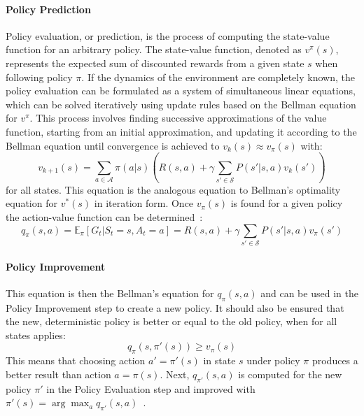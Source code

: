 \documentclass[../xlapes02]{subfiles}
\begin{document}
    \paragraph{Policy Prediction}\label{par:policy-prediction}
    Policy evaluation, or prediction, is the process of computing the state-value function for an arbitrary policy. The state-value function, denoted as $v^\pi(s)$, represents the expected sum of discounted rewards from a given state $s$ when following policy $\pi$. If the dynamics of the environment are completely known, the policy evaluation can be formulated as a system of simultaneous linear equations, which can be solved iteratively using update rules based on the Bellman equation for $v^\pi$. This process involves finding successive approximations of the value function, starting from an initial approximation, and updating it according to the Bellman equation until convergence is achieved to $v_k(s) \approx v_{\pi}(s)$ with:
    \[
        v_{k+1}(s) = \sum_{a \in \mathcal{A}} \pi(a|s) \left( R(s, a) + \gamma \sum_{s' \in \mathcal{S}} P(s'|s, a) v_k(s') \right)
    \]
    for all states. This equation is the analogous equation to Bellman's optimality equation for $v^*(s)$ in iteration form. Once $v_{\pi}(s)$ is found for a given policy the action-value function can be determined~\cite{sutton2018reinforcement, FITMT25127}:
    \[
        q_{\pi}(s,a) = \mathbb{E}_{\pi}[G_t|S_t = s, A_t = a] = R(s,a) + \gamma \sum_{s' \in \mathcal{S}} P(s'|s,a) v_{\pi}(s')
    \]

    \paragraph{Policy Improvement}\label{par:policy-improvement}
    This equation is then the Bellman's equation for $q_{\pi}(s,a)$ and can be used in the Policy Improvement step to create a new policy. It should also be ensured that the new, deterministic policy is better or equal to the old policy, when for all states applies:
    \[
        q_{\pi}(s, \pi'(s)) \geq v_{\pi}(s)
    \]
    This means that choosing action $a' = \pi'(s)$ in state $s$ under policy $\pi$ produces a better result than action $a = \pi(s)$. Next, $q_{\pi'}(s, a)$ is computed for the new policy $\pi'$ in the Policy Evaluation step and improved with $\pi'(s) = \arg\max_a q_{\pi'}(s, a)$~\cite{sutton2018reinforcement, FITMT25127}.
\end{document}
